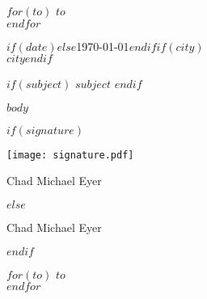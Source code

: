 \documentclass[$fontsize$, letter]{article}
\begin{document}
\small

\vspace{1em}

\normalsize \sffamily
$for(to)$
$to$\\
$endfor$

\vspace{3em}

\rmfamily
\begin{flushright}
  $if(date)$$else$\today$endif$$if(city)$\\$city$$endif$
\end{flushright}

\vspace{1em}

$if(subject)$
\textbf{$subject$}
$endif$

\vspace{1em}

$body$

$if(signature)$
{
    \begin{FlushRight}  	\parbox[t]{0.6in}{\texttt{[image: signature.pdf]}}
    \vspace*{-3\baselineskip}Chad Michael Eyer
    \end{FlushRight}
}
$else$
    \begin{FlushRight}
    \vspace*{2.875\baselineskip}Chad Michael Eyer
    \end{FlushRight}
$endif$

\clearpage


$for(to)$
\large\textocr\uppercase{$to$}\\
$endfor$
\end{document}
